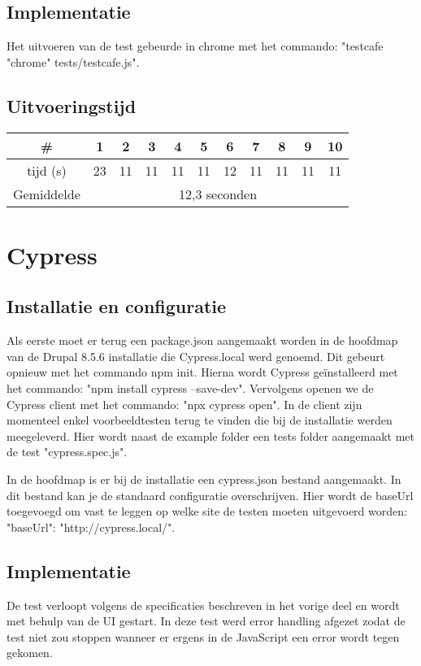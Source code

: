 \subsection{Implementatie}
Het uitvoeren van de test gebeurde in chrome met het commando: "testcafe "chrome" tests/testcafe.js".


\subsection{Uitvoeringstijd}


\begin{center}
\begin{tabular}{ |c| |c |c |c |c |c |c |c |c |c |c| }
\hline
	\# & 1 & 2 & 3 & 4 & 5 & 6 & 7 & 8 & 9 & 10\\
\hline
	tijd (s) & 23 & 11 & 11 & 11 & 11 & 12 & 11 & 11 & 11 & 11\\
\hline
 Gemiddelde & \multicolumn{10}{c|}{12,3 seconden}\\
\hline
\end{tabular}
\end{center}

\section{Cypress}

\subsection{Installatie en configuratie}

Als eerste moet er terug een package.json aangemaakt worden in de hoofdmap van de Drupal 8.5.6 installatie die Cypress.local werd genoemd. Dit gebeurt opnieuw met het commando npm init. Hierna wordt Cypress geïnstalleerd met het commando: "npm install cypress --save-dev". Vervolgens openen we de Cypress client met het commando: "npx cypress open". In de client zijn momenteel enkel voorbeeldtesten terug te vinden die bij de installatie werden meegeleverd. Hier wordt naast de example folder een tests folder aangemaakt met de test "cypress.spec.js".

In de hoofdmap is er bij de installatie een cypress.json bestand aangemaakt. In dit bestand kan je de standaard configuratie overschrijven. Hier wordt de baseUrl toegevoegd om vast te leggen op welke site de testen moeten uitgevoerd worden: "baseUrl": "http://cypress.local/".

\subsection{Implementatie}
De test verloopt volgens de specificaties beschreven in het vorige deel en wordt met behulp van de UI gestart. In deze test werd error handling afgezet zodat de test niet zou stoppen wanneer er ergens in de JavaScript een error wordt tegen gekomen.

